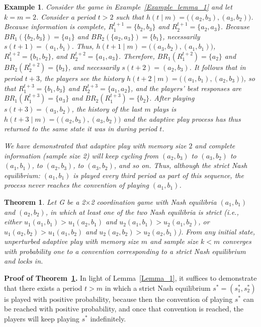 \documentclass[11.5pt]{article}
\newtheorem{theorem}{Theorem}
\newtheorem{example}{Example}
\begin{document}
\begin{example}\label{Example2_lemma_1} 
Consider the game in Example~\ref{Example_lemma_1} and let $k = m = 2$. Consider a period 
$t > 2$ such that  $h(t\mid m) = \big((a_2, b_3), (a_3, b_2)\big)$. Because information is complete, $R_1^{t+1} = \{b_2, b_3\}$ and $R_2^{t+1} = \{a_2, a_3\}$. 
Because $BR_1(\{b_2, b_3\})=\{a_1\}$ and $BR_2(\{a_2, a_3\})=\{b_1\}$, necessarily $s(t+1) = (a_1, b_1)$. 
%
Thus, $h(t+1\mid m) = \big((a_3, b_2), (a_1, b_1)\big)$, $R_1^{t+2} = \{b_1, b_2\}$, and $R_2^{t+2} = \{a_1, a_3\}$. 
Therefore, $BR_1(R_1^{t+2})=\{a_2\}$ and $BR_2(R_2^{t+2})=\{b_3\}$, and necessarily $s(t+2) = (a_2, b_3)$. 
%
It follows that in period $t+3$, the players see the history $h(t+2\mid m) = \big((a_1,b_1),(a_2, b_3)\big)$, 
so that $R_1^{t+3} = \{b_1, b_3\}$ and $R_2^{t+3} = \{a_1, a_2\}$, and the players' best responses are $BR_1(R_1^{t+3})=\{a_3\}$ and $BR_2(R_1^{t+3})=\{b_2\}$. 
%
After playing $s(t+3) = (a_3, b_2)$, the history of the last $m$ plays is $h(t+3\mid m) = \big((a_2, b_3), (a_3, b_2)\big)$ and the adaptive play process has thus returned to the same state it was in during period $t$. 

We have demonstrated that adaptive play with memory size $2$ and complete information (sample size 2) will keep cycling from $(a_2, b_3)$ to $(a_3, b_2)$ to $(a_1, b_1)$, to $(a_2, b_3)$, to  $(a_3, b_2)$, and so on.  
%
Thus, although the strict Nash equilibrium: $(a_1, b_1)$ is played every third period as part of this sequence, the process never reaches the convention of playing $(a_1, b_1)$. 
\end{example}



\begin{theorem}\label{Theorem_1}
Let G be a 2$\times$2 coordination game with Nash equilibria $(a_1,b_1)$ and $(a_2,b_2)$,  
in which at least one of the two Nash equilibria is strict (i.e., either $u_1(a_1,b_1) > u_1(a_2,b_1)$ and $u_2(a_1,b_1) > u_2(a_1,b_2)$, or $u_1(a_2,b_2) > u_1(a_1,b_2)$ and $u_2(a_2,b_2) > u_2(a_2,b_1)$). 
%
From any initial state, unperturbed adaptive play with memory size $m$ and sample size $k < m$ converges with probability one to a convention corresponding to a strict Nash equilibrium and locks in.
\end{theorem}


\textbf{Proof of Theorem~\ref{Theorem_1}.}
In light of Lemma~\ref{Lemma_1}, it suffices to demonstrate that there exists a period $t > m$ in which a strict Nash equilibrium $s^*=(s_1^*,s_2^*)$ is played with positive probability, because then the convention of playing $s^*$ can be reached with positive probability, and once that convention is reached, the players will keep playing $s^*$ indefinitely.
\end{document}
